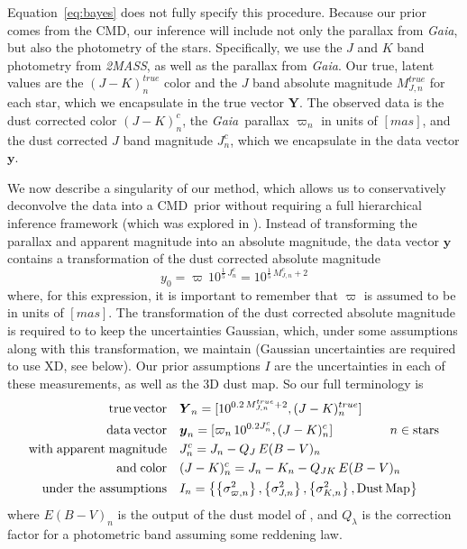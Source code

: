 \documentclass[modern]{aastex61}
\newcommand{\acronym}[1]{{\small{#1}}}
\newcommand{\project}[1]{\textsl{#1}}
\newcommand{\tmass}{\project{\acronym{2MASS}}}
\newcommand{\gaia}{\project{Gaia}}
\newcommand{\xd}{\acronym{XD}}
\newcommand{\cmd}{\acronym{CMD}}
\renewcommand{\vec}[1]{\boldsymbol{{#1}}}
\newcommand{\truth}{\vec{Y}}
\newcommand{\data}{\vec{y}}
\begin{document}
Equation~\ref{eq:bayes} does not fully specify this procedure.
Because our prior comes from the \cmd, our inference will include not only the parallax from \gaia, but also the photometry of the stars. Specifically, we use the $J$ and $K$ band photometry from \tmass, as well as the parallax from \gaia. Our true, latent values are the $(J-K)^{true}_n$ color and the $J$ band absolute magnitude $M^{true}_{J,n}$ for each star, which we encapsulate in the true vector $\truth$. The observed data is the dust corrected color $(J-K)^c_n$, the \gaia\ parallax $\varpi_n$ in units of $[mas]$, and the dust corrected $J$ band magnitude $J^c_n$, which we encapsulate in the data vector $\data$.

We now describe a singularity of our method, which allows us to conservatively deconvolve the data into a \cmd\ prior without requiring a full hierarchical inference framework (which was explored in \citealt{leistedtHogg2017}).
Instead of transforming the parallax and apparent magnitude into an absolute magnitude, the data vector $\data$ contains a transformation of the dust corrected absolute magnitude
\begin{equation}
y_0 = \varpi\,10^{\frac{1}{5}\,J^c_n} = 10^{\frac{1}{5}\,M^c_{J,n} + 2}
\label{eq:transform}
\end{equation}
where, for this expression, it is important to remember that $\varpi$ is assumed to be in units of $[mas]$.
The transformation of the dust corrected absolute magnitude is required to to keep the uncertainties Gaussian, which, under some assumptions along with this transformation, we maintain (Gaussian uncertainties are required to use \xd, see below).
Our prior assumptions $I$ are the uncertainties in each of these measurements, as well as the 3D dust map. So our full terminology is
\begin{equation}
\begin{aligned}
\mathrm{true \, vector} \quad &\truth_n = [10^{0.2\,M^{true}_{J,n} + 2}, (J-K)^{true}_n] \\
\mathrm{data \, vector} \quad &\data_n = [\varpi_n\,10^{0.2J^c_n}, (J- K)^c_n] \;\hspace*{15mm}  n \in \mathrm{stars} \\
\mathrm{with \; apparent \; magnitude} \quad &J^c_n = J_n - Q_J\,E(B-V)_n \\
\mathrm{and \; color} \quad &(J - K)^c_n = J_n - K_n - Q_{JK}\,E(B-V)_n \\
\mathrm{under\ the\ assumptions} \quad &I_n = \left\{\left\{\sigma^2_{\varpi, n}\right\}, \left\{\sigma^2_{J,n}\right\}, \left\{\sigma^2_{K,n}\right\}, \mathrm{Dust \, Map}\right\}
\end{aligned}
\label{eq:data}
\end{equation}
where $E(B-V)_n$ is the output of the dust model of \cite{green15}, and $Q_{\lambda}$ is the correction factor for a photometric band assuming some reddening law.
\end{document}
